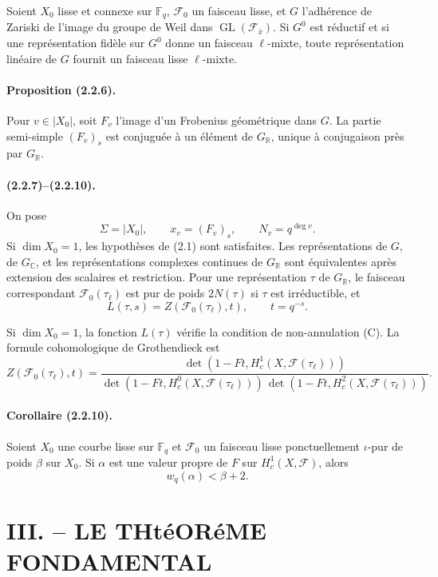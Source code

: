 \documentclass[11pt]{article}
\theoremstyle{remark}
\newcommand{\CC}{\mathbb{C}}
\newcommand{\RR}{\mathbb{R}}
\newcommand{\Fq}{\mathbb{F}_q}
\begin{document}
Soient \(X_0\) lisse et connexe sur \(\Fq\), \(\mathcal F_0\) un faisceau lisse, et \(G\) l'adhérence de Zariski de l'image du groupe de Weil dans \(\operatorname{GL}(\mathcal F_{\bar x})\). Si \(G^0\) est réductif et si une représentation fidèle sur \(G^0\) donne un faisceau \(\ell\)-mixte, toute représentation linéaire de \(G\) fournit un faisceau lisse \(\ell\)-mixte.

\paragraph{Proposition (2.2.6).}
Pour \(v\in|X_0|\), soit \(F_v\) l'image d'un Frobenius géométrique dans \(G\). La partie semi-simple \((F_v)_s\) est conjuguée à un élément de \(G_\RR\), unique à conjugaison près par \(G_\RR\).

\paragraph{(2.2.7)--(2.2.10).}
On pose
\[
\Sigma=|X_0|,\qquad x_v=(F_v)_s,\qquad N_v=q^{\deg v}.
\]
Si \(\dim X_0=1\), les hypothèses de (2.1) sont satisfaites. Les représentations de \(G\), de \(G_\CC\), et les représentations complexes continues de \(G_\RR\) sont équivalentes après extension des scalaires et restriction. Pour une représentation \(\tau\) de \(G_\RR\), le faisceau correspondant \(\mathcal F_0(\tau_\ell)\) est pur de poids \(2N(\tau)\) si \(\tau\) est irréductible, et
\[
L(\tau,s)=Z(\mathcal F_0(\tau_\ell),t),\qquad t=q^{-s}.
\]

Si \(\dim X_0=1\), la fonction \(L(\tau)\) vérifie la condition de non-annulation (C). La formule cohomologique de Grothendieck est
\[
Z(\mathcal F_0(\tau_\ell),t)=
\frac{\det(1-Ft,H^1_c(X,\mathcal F(\tau_\ell)))}
{\det(1-Ft,H^0_c(X,\mathcal F(\tau_\ell)))\,
 \det(1-Ft,H^2_c(X,\mathcal F(\tau_\ell)))} .
\]

\paragraph{Corollaire (2.2.10).}
Soient \(X_0\) une courbe lisse sur \(\Fq\) et \(\mathcal F_0\) un faisceau lisse ponctuellement \(\iota\)-pur de poids \(\beta\) sur \(X_0\). Si \(\alpha\) est une valeur propre de \(F\) sur \(H^1_c(X,\mathcal F)\), alors
\[
w_q(\alpha)<\beta+2.
\]

\clearpage
\section*{III. -- LE THtéORéME FONDAMENTAL}
\end{document}
